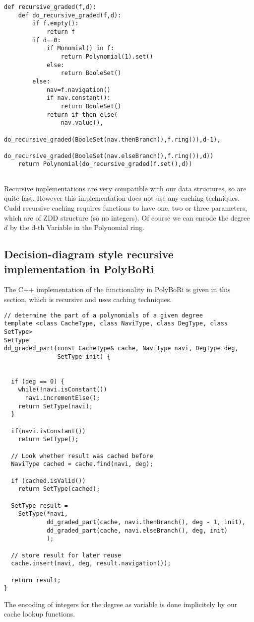 \documentclass[]{article}
\newcommand{\PolyBoRi}{{\sc PolyBoRi}\xspace}
\begin{document}
\begin{verbatim}
def recursive_graded(f,d):
    def do_recursive_graded(f,d):
        if f.empty():
            return f
        if d==0:
            if Monomial() in f:
                return Polynomial(1).set()
            else:
                return BooleSet()
        else:
            nav=f.navigation()
            if nav.constant():
                return BooleSet()
            return if_then_else(
                nav.value(),
                do_recursive_graded(BooleSet(nav.thenBranch(),f.ring()),d-1),
                do_recursive_graded(BooleSet(nav.elseBranch(),f.ring()),d))
    return Polynomial(do_recursive_graded(f.set(),d))
        
\end{verbatim}
Recursive implementations are very compatible with our data structures, so are quite fast. However this implementation does not use any caching techniques. Cudd recursive caching requires functions to have one, two or three parameters, which are of ZDD structure (so no integers).
Of course we can encode the degree $d$ by the d-th Variable in the Polynomial
ring.

\subsection{Decision-diagram style recursive implementation in \PolyBoRi}
The C++ implementation of the functionality in \PolyBoRi is given in this section, which is recursive and uses caching techniques.
\begin{verbatim}
// determine the part of a polynomials of a given degree
template <class CacheType, class NaviType, class DegType, class SetType>
SetType
dd_graded_part(const CacheType& cache, NaviType navi, DegType deg,  
               SetType init) {


  if (deg == 0) {
    while(!navi.isConstant())
      navi.incrementElse();
    return SetType(navi);
  }

  if(navi.isConstant())
    return SetType();

  // Look whether result was cached before
  NaviType cached = cache.find(navi, deg);

  if (cached.isValid())
    return SetType(cached);

  SetType result = 
    SetType(*navi,  
            dd_graded_part(cache, navi.thenBranch(), deg - 1, init),
            dd_graded_part(cache, navi.elseBranch(), deg, init)
            );

  // store result for later reuse
  cache.insert(navi, deg, result.navigation());

  return result;
}
\end{verbatim}
The encoding of integers for the degree as variable is done implicitely by our cache lookup functions.
\end{document}
